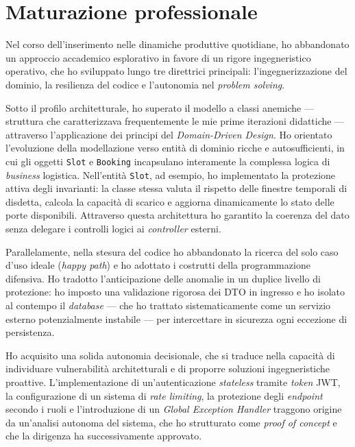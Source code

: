 \section{Maturazione professionale}
\label{sec:maturazione_professionale}

Nel corso dell'inserimento nelle dinamiche produttive quotidiane, ho abbandonato un approccio accademico esplorativo in favore di un rigore ingegneristico operativo, che ho sviluppato lungo tre direttrici principali: l'ingegnerizzazione del dominio, la resilienza del codice e l'autonomia nel \textit{problem solving}.

Sotto il profilo architetturale, ho superato il modello a classi anemiche --- struttura che caratterizzava frequentemente le mie prime iterazioni didattiche --- attraverso l'applicazione dei principi del \textit{Domain-Driven Design}. Ho orientato l'evoluzione della modellazione verso entità di dominio ricche e autosufficienti, in cui gli oggetti \texttt{Slot} e \texttt{Booking} incapsulano interamente la complessa logica di \textit{business} logistica. Nell'entità \texttt{Slot}, ad esempio, ho implementato la protezione attiva degli invarianti: la classe stessa valuta il rispetto delle finestre temporali di disdetta, calcola la capacità di scarico e aggiorna dinamicamente lo stato delle porte disponibili. Attraverso questa architettura ho garantito la coerenza del dato senza delegare i controlli logici ai \textit{controller} esterni.


Parallelamente, nella stesura del codice ho abbandonato la ricerca del solo caso d'uso ideale (\textit{happy path}) e ho adottato i costrutti della programmazione difensiva. Ho tradotto l'anticipazione delle anomalie in un duplice livello di protezione: ho imposto una validazione rigorosa dei DTO in ingresso e ho isolato al contempo il \textit{database} --- che ho trattato sistematicamente come un servizio esterno potenzialmente instabile --- per intercettare in sicurezza ogni eccezione di persistenza.

Ho acquisito una solida autonomia decisionale, che si traduce nella capacità di individuare vulnerabilità architetturali e di proporre soluzioni ingegneristiche proattive. L'implementazione di un'autenticazione \textit{stateless} tramite \textit{token} JWT, la configurazione di un sistema di \textit{rate limiting}, la protezione degli \textit{endpoint} secondo i ruoli e l'introduzione di un \textit{Global Exception Handler} traggono origine da un'analisi autonoma del sistema, che ho strutturato come \textit{proof of concept} e che la dirigenza ha successivamente approvato.

